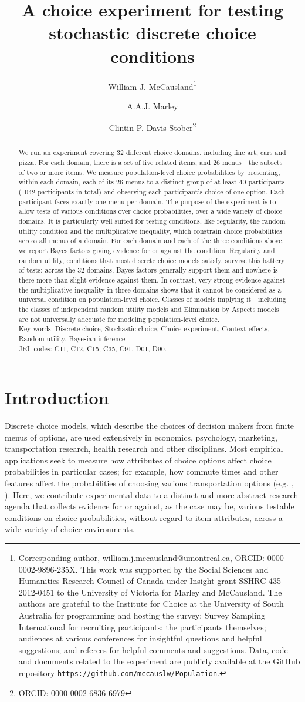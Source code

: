 \documentclass[11pt,letter]{article}
\title{A choice experiment for testing stochastic discrete choice conditions}
\author[1]{William J. McCausland\thanks{Corresponding author, william.j.mccausland@umontreal.ca, ORCID: 0000-0002-9896-235X.
This work was supported by the Social Sciences and Humanities Research Council of Canada under Insight grant SSHRC 435-2012-0451 to the University of Victoria for Marley and McCausland.
The authors are grateful to the Institute for Choice at the University of South Australia for programming and hosting the survey; Survey Sampling International for recruiting participants; the participants themselves; audiences at various conferences for insightful questions and helpful suggestions; and referees for helpful comments and suggestions.
Data, code and documents related to the experiment are publicly available at the GitHub repository \texttt{https://github.com/mccauslw/Population}.}}
\author[2]{A.A.J. Marley}
\author[3]{Clintin P. Davis-Stober\thanks{ORCID: 0000-0002-6836-6979}}
\affil[1]{D\'epartement de sciences \'economiques and CIREQ, Universit\'e de Montr\'eal, Canada}
\affil[2]{Department of Psychology, University of Victoria, Canada}
\affil[3]{Department of Psychological Sciences; MU Institute for Data Science and Informatics, University of Missouri, U.S.A.}
\newcommand{\menu}{menu}
\newcommand{\menus}{menus}
\begin{document}
\maketitle

\begin{abstract}
  We run an experiment covering 32 different choice domains, including fine art, cars and pizza.
  For each domain, there is a set of five related items, and 26 \menus{}---the subsets of two or more items.
  We measure population-level choice probabilities by presenting, within each domain, each of its 26 \menus{} to a distinct group of at least 40 participants (1042 participants in total) and observing each participant's choice of one option.
  Each participant faces exactly one \menu{} per domain.
  The purpose of the experiment is to allow tests of various conditions over choice probabilities, over a wide variety of choice domains.
  It is particularly well suited for testing conditions, like regularity, the random utility condition and the multiplicative inequality, which constrain choice probabilities across all \menus{} of a domain.
  For each domain and each of the three conditions above, we report Bayes factors giving evidence for or against the condition.
  Regularity and random utility, conditions that most discrete choice models satisfy, survive this battery of tests: across the 32 domains, Bayes factors generally support them and nowhere is there more than slight evidence against them.
  In contrast, very strong evidence against the multiplicative inequality in three domains shows that it cannot be considered as a universal condition on population-level choice.
  Classes of models implying it---including the classes of independent random utility models and Elimination by Aspects models---are not universally adequate for modeling population-level choice.
  \\
  Key words: Discrete choice, Stochastic choice, Choice experiment, Context effects, Random utility, Bayesian inference \\
  JEL codes: C11, C12, C15, C35, C91, D01, D90.
\end{abstract}


\section{Introduction}\label{s:intro}

Discrete choice models, which describe the choices of decision makers from finite menus of options, are used extensively in economics, psychology, marketing, transportation research, health research and other disciplines.
Most empirical applications seek to measure how attributes of choice options affect choice probabilities in particular cases; for example, how commute times and other features affect the probabilities of choosing various transportation options (e.g. \citeauthor{Trai78}, \citeyear{Trai78}).
Here, we contribute experimental data to a distinct and more abstract research agenda that collects evidence for or against, as the case may be, various testable conditions on choice probabilities, without regard to item attributes, across a wide variety of choice environments.
\end{document}

